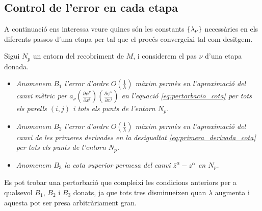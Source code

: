 \subsection{Control de l'error en cada etapa}
A continuació ens interessa veure quines són les constants $\{\lambda_\nu\}$ necessàries en els diferents passos d'una etapa per tal que el procés convergeixi tal com desitgem.
\begin{defi}
    Sigui $N_p$ un entorn del recobriment de $M$, i considerem el pas $\nu$ d'una etapa donada.
\end{defi}
\begin{itemize}\label{def: B1 B2 B3}
    \item \textit{Anomenem $B_1$ l'error d'ordre $O\left(\frac1{\lambda}\right)$ màxim permès en l'aproximació del canvi mètric per $a_\nu\left(\frac{\partial\psi^\nu}{\partial x^i}\right)\left(\frac{\partial\psi^\nu}{\partial x^j}\right)$ en l'equació \eqref{eq:pertorbacio_cota} per tots els parells $(i,j)$ i tots els punts de l'entorn $N_p$.}
    \item \textit{Anomenem $B_2$ l'error d'ordre $O\left(\frac1{\lambda}\right)$ màxim permès en l'aproximació del canvi de les primeres derivades en la desigualtat \eqref{eq:primera_derivada_cota} per tots els punts de l'entorn $N_p$.}
    \item \textit{Anomenem $B_3$ la cota superior permesa del canvi $\overline{z}^\alpha - z^\alpha$ en $N_p$.}
\end{itemize}
\begin{obs}
    Es pot trobar una pertorbació que compleixi les condicions anteriors per a qualsevol $B_1$, $B_2$ i $B_3$ donats, ja que tots tres disminueixen quan $\lambda$ augmenta i aquesta pot ser presa arbitràriament gran.
\end{obs}

